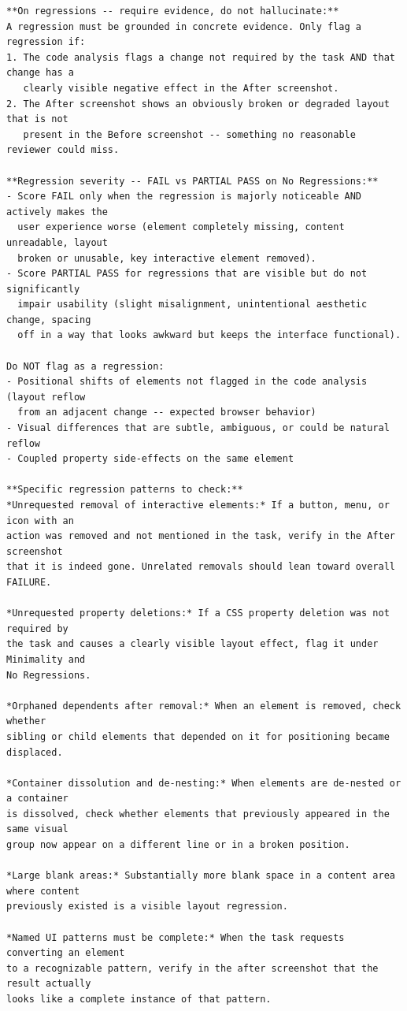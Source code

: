 \documentclass[sigconf,nonacm]{acmart}
\begin{document}
\begin{mdframed}[style=promptbox]
\begin{lstlisting}[basicstyle=\scriptsize\ttfamily, breaklines=true, breakatwhitespace=true,
                   xleftmargin=0pt, xrightmargin=0pt]
**On regressions -- require evidence, do not hallucinate:**
A regression must be grounded in concrete evidence. Only flag a regression if:
1. The code analysis flags a change not required by the task AND that change has a
   clearly visible negative effect in the After screenshot.
2. The After screenshot shows an obviously broken or degraded layout that is not
   present in the Before screenshot -- something no reasonable reviewer could miss.

**Regression severity -- FAIL vs PARTIAL PASS on No Regressions:**
- Score FAIL only when the regression is majorly noticeable AND actively makes the
  user experience worse (element completely missing, content unreadable, layout
  broken or unusable, key interactive element removed).
- Score PARTIAL PASS for regressions that are visible but do not significantly
  impair usability (slight misalignment, unintentional aesthetic change, spacing
  off in a way that looks awkward but keeps the interface functional).

Do NOT flag as a regression:
- Positional shifts of elements not flagged in the code analysis (layout reflow
  from an adjacent change -- expected browser behavior)
- Visual differences that are subtle, ambiguous, or could be natural reflow
- Coupled property side-effects on the same element

**Specific regression patterns to check:**
*Unrequested removal of interactive elements:* If a button, menu, or icon with an
action was removed and not mentioned in the task, verify in the After screenshot
that it is indeed gone. Unrelated removals should lean toward overall FAILURE.

*Unrequested property deletions:* If a CSS property deletion was not required by
the task and causes a clearly visible layout effect, flag it under Minimality and
No Regressions.

*Orphaned dependents after removal:* When an element is removed, check whether
sibling or child elements that depended on it for positioning became displaced.

*Container dissolution and de-nesting:* When elements are de-nested or a container
is dissolved, check whether elements that previously appeared in the same visual
group now appear on a different line or in a broken position.

*Large blank areas:* Substantially more blank space in a content area where content
previously existed is a visible layout regression.

*Named UI patterns must be complete:* When the task requests converting an element
to a recognizable pattern, verify in the after screenshot that the result actually
looks like a complete instance of that pattern.


\end{lstlisting}
\end{mdframed}
\end{document}
